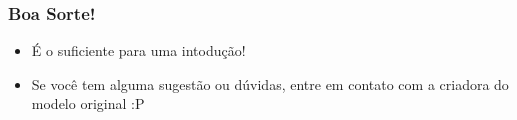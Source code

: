 \begin{frame}
\frametitle{Boa Sorte!}
\begin{itemize}
\item É o suficiente para uma intodução!
\item Se você tem alguma sugestão ou dúvidas, entre em contato com a criadora do modelo original :P
\end{itemize}
\end{frame}

